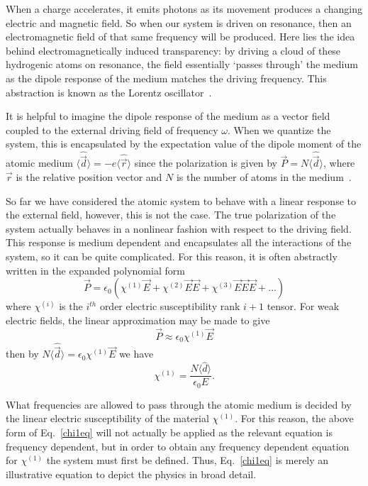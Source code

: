 \documentclass[aps,pra,showpacs,amsmath,amssymb,nofootinbib,longbibliography,superscriptaddress
]{revtex4-1}
\theoremstyle{definition}
\theoremstyle{remark}
\newcommand{\0}{\hat{0}}
\newcommand{\expect}[1]{\bigl\langle #1 \bigr\rangle}
\begin{document}
When a charge accelerates, it emits photons as its movement produces a changing electric and magnetic field. So when our system is driven on resonance, then an electromagnetic field of that same frequency will be produced. Here lies the idea behind electromagnetically induced transparency: by driving a cloud of these hydrogenic atoms on resonance, the field essentially `passes through' the medium as the dipole response of the medium matches the driving frequency. This abstraction is known as the Lorentz oscillator~\cite{Peatross}.

It is helpful to imagine the dipole response of the medium as a vector field coupled to the external driving field of frequency $\omega$. When we quantize the system, this is encapsulated by the expectation value of the dipole moment of the atomic medium $\expect{\hat{\vec{d}}} = -e \expect{\hat{\vec{r}}}$ since the polarization is given by $\vec{P} = N \expect{\hat{\vec{d}}}$, where $\vec{r}$ is the relative position vector and $N$ is the number of atoms in the medium~\cite{Optics}.

So far we have considered the atomic system to behave with a linear response to the external field, however, this is not the case. The true polarization of the system actually behaves in a nonlinear fashion with respect to the driving field. This response is medium dependent and encapsulates all the interactions of the system, so it can be quite complicated. For this reason, it is often abstractly written in the expanded polynomial form~\cite{Nonlinear}
\begin{equation}\label{PolarizationEq}
    \vec{P} = \epsilon_0 \left( \chi^{(1)} \vec{E} + \chi^{(2)} \vec{E}\vec{E} + \chi^{(3)} \vec{E}\vec{E}\vec{E} + \ldots\right)
\end{equation}
where $\chi^{(i)}$ is the $i^{th}$ order electric susceptibility rank $i+1$ tensor. For weak electric fields, the linear approximation may be made to give
\begin{equation}
    \vec{P} \approx \epsilon_0 \chi^{(1)} \vec{E}
\end{equation}
then by $N \expect{\hat{\vec{d}}} = \epsilon_0 \chi^{(1)} \vec{E}$ we have
\begin{equation}\label{chi1eq}
    \chi^{(1)} = \frac{N \expect{\hat{d}}}{\epsilon_0 E}.
\end{equation}

What frequencies are allowed to pass through the atomic medium is decided by the linear electric susceptibility of the material $\chi^{(1)}$. For this reason, the above form of Eq.~\eqref{chi1eq} will not actually be applied as the relevant equation is frequency dependent, but in order to obtain any frequency dependent equation for $\chi^{(1)}$ the system must first be defined. Thus, Eq.~\eqref{chi1eq} is merely an illustrative equation to depict the physics in broad detail.
\end{document}

